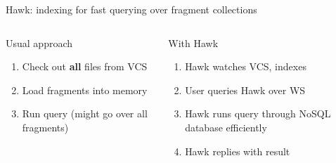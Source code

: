 \documentclass[10pt]{beamer}
\begin{document}
\begin{frame}{Hawk: indexing for fast querying over fragment collections}
  \centering

  \begin{columns}[t]
    \centering
    \begin{block}{Usual approach}
      \begin{enumerate}
      \item Check out \textbf{all} files from VCS
      \item Load fragments into memory
      \item Run query (might go over all fragments)
      \end{enumerate}
    \end{block}

    \centering
    \begin{block}{With Hawk}
      \begin{enumerate}
      \item Hawk watches VCS, indexes
      \item User queries Hawk over WS
      \item Hawk runs query through NoSQL database efficiently
      \item Hawk replies with result
      \end{enumerate}
    \end{block}

  \end{columns}

\end{frame}
\end{document}
